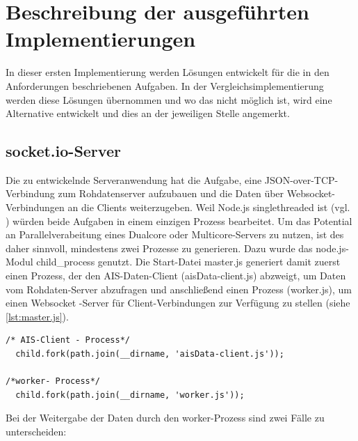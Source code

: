 \section{Beschreibung der ausgeführten Implementierungen}
In dieser ersten Implementierung werden Lösungen entwickelt für die in den Anforderungen beschriebenen Aufgaben. In der Vergleichsimplementierung werden diese Lösungen übernommen und wo das nicht möglich ist, wird eine Alternative entwickelt und dies an der jeweiligen Stelle angemerkt.

\subsection{socket.io-Server}\label{socket.io-Server}
Die zu entwickelnde Serveranwendung hat die Aufgabe, eine JSON-over-TCP-Verbindung zum Rohdatenserver aufzubauen und die Daten über Websocket-Verbindungen an die Clients weiterzugeben.
Weil Node.js singlethreaded ist (vgl. \cite{teixeira}) würden beide Aufgaben in einem einzigen Prozess bearbeitet. Um das Potential an Parallelverabeitung eines Dualcore oder Multicore-Servers zu nutzen, ist des daher sinnvoll, mindestens zwei Prozesse zu generieren. Dazu wurde das node.js-Modul child\_process genutzt. Die Start-Datei master.js generiert damit zuerst einen Prozess, der den AIS-Daten-Client (aisData-client.js) abzweigt, um Daten vom Rohdaten-Server abzufragen und anschließend einen Prozess (worker.js), um einen Websocket -Server für Client-Verbindungen zur Verfügung zu stellen (siehe \ref{lst:master.js}).
\begin{lstlisting}[caption=Generierung von Kindprozessen in master.js, firstnumber=16, label=master.js]
/* AIS-Client - Process*/
  child.fork(path.join(__dirname, 'aisData-client.js'));

/*worker- Process*/
  child.fork(path.join(__dirname, 'worker.js'));
\end{lstlisting}
Bei der Weitergabe der Daten durch den worker-Prozess sind zwei Fälle zu unterscheiden:

